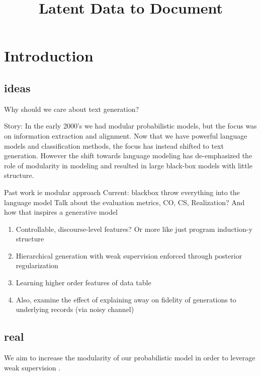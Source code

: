 \documentclass{article}
\title{Latent Data to Document}
\begin{document}
\maketitle

\section{Introduction}
\subsection{ideas}
Why should we care about text generation?

Story:
In the early 2000's we had modular probabilistic models,
but the focus was on information extraction and alignment.
Now that we have powerful language models and classification methods,
the focus has instead shifted to text generation.
However the shift towards language modeling has de-emphasized the role of
modularity in modeling and resulted in large black-box models with little structure. 
\citep{wiseman2017d2t}

Past work ie \citep{liang2009semalign} modular approach
Current: blackbox throw everything into the language model
\citep{wiseman2017d2t}
Talk about the evaluation metrics, CO, CS, Realization?
And how that inspires a generative model

\begin{enumerate}
\item Controllable, discourse-level features?
Or more like just program induction-y structure
\citet{rabinovich17codegen}
\item Hierarchical generation with weak supervision enforced through posterior regularization
\citep{ganchev2007empc,graca2010pralign,ganchev2010posteriorregularization}
\item Learning higher order features of data table
\item Also, examine the effect of explaining away on fidelity of
generations to underlying records (via noisy channel)
\citep{klein2002conditional,yu2016noisychannel,brown1993mt}
\end{enumerate}

\subsection{real}

We aim to increase the modularity of our probabilistic model in order to leverage weak supervision
\citep{ganchev2010posteriorregularization}.
\end{document}
